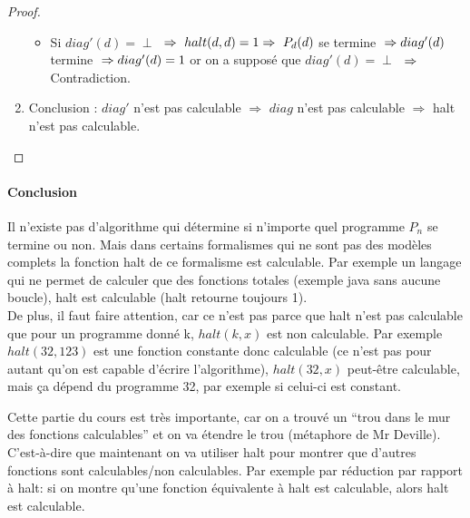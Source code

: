\begin{mytheo}[halt]
\begin{proof}
\begin{enumerate}
\begin{itemize}
				\item Si $diag'(d)= \perp$ $\\
				\Rightarrow \  halt(d,d) = 1 \\
				\Rightarrow \ P_d(d)$ se termine $ \\
				\Rightarrow diag'(d)$ termine $ \\
				\Rightarrow diag'(d) = 1$ or on a supposé que $diag'(d) = \perp$ $ \\
				\Rightarrow $
				Contradiction.
			\end{itemize}
		\item Conclusion : $diag'$ n'est pas calculable $ \Rightarrow $ $diag$
		n'est pas calculable $ \Rightarrow $ halt n'est pas calculable.

	\end{enumerate}
	\end{proof}

\end{mytheo}

\paragraph{Conclusion} Il n'existe pas d'algorithme qui détermine si n'importe quel programme $P_n$ se termine ou non. Mais dans certains formalismes qui ne sont pas des modèles complets la fonction halt de ce formalisme est calculable.
Par exemple un langage qui ne permet de calculer
que des fonctions totales (exemple java sans aucune boucle), halt est calculable (halt retourne toujours 1). \\

De plus, il faut faire attention, car ce n'est pas parce que halt n'est pas calculable que pour un programme donné k, $halt(k,x)$ est non calculable. Par exemple $halt(32,123)$ est une fonction constante donc calculable (ce n'est pas pour autant qu'on est capable d'écrire l'algorithme), $halt(32,x)$ peut-être calculable, mais ça dépend du programme 32, par exemple si celui-ci est constant.

\begin{myrem}
	Cette partie du cours est très importante, car on a trouvé un ``trou dans le mur des fonctions calculables'' et on va étendre le trou (métaphore
	de Mr Deville). C'est-à-dire que maintenant on va utiliser halt pour montrer que d'autres fonctions sont calculables/non calculables. Par exemple	par réduction par rapport à halt: si on montre qu'une fonction équivalente à halt est calculable, alors halt est calculable.
\end{myrem}

